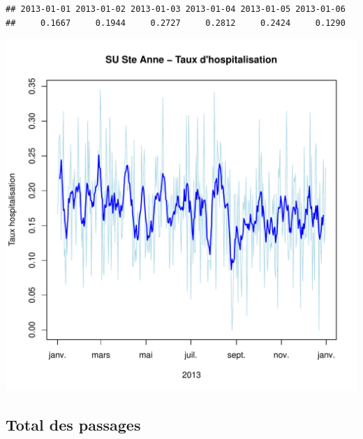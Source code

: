 \documentclass[12pt,english,french,twoside]{report}\usepackage[]{graphicx}\usepackage[]{color}
\makeatletter
\def\maxwidth{ %
  \ifdim\Gin@nat@width>\linewidth
    \linewidth
  \else
    \Gin@nat@width
  \fi
}
\newenvironment{kframe}{%
 \def\at@end@of@kframe{}%
 \ifinner\ifhmode%
  \def\at@end@of@kframe{\end{minipage}}%
  \begin{minipage}{\columnwidth}%
 \fi\fi%
 \def\FrameCommand##1{\hskip\@totalleftmargin \hskip-\fboxsep
 \colorbox{shadecolor}{##1}\hskip-\fboxsep
     \hskip-\linewidth \hskip-\@totalleftmargin \hskip\columnwidth}%
 \MakeFramed {\advance\hsize-\width
   \@totalleftmargin\z@ \linewidth\hsize
   \@setminipage}}%
 {\par\unskip\endMakeFramed%
 \at@end@of@kframe}
\newenvironment{knitrout}{}{} %
\makeatother
\begin{document}
\begin{knitrout}
\color{fgcolor}\begin{kframe}
\begin{verbatim}
## 2013-01-01 2013-01-02 2013-01-03 2013-01-04 2013-01-05 2013-01-06 
##     0.1667     0.1944     0.2727     0.2812     0.2424     0.1290
\end{verbatim}
\end{kframe}
\includegraphics[width=\maxwidth]{figure/hospit_stAnne} 

\end{knitrout}


\subsection{Total des passages}
\end{document}
